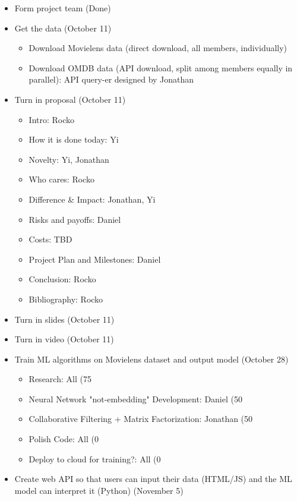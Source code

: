 \documentclass[sigchi, 12pt, nonacm=true, timestamp=true, screen=true]{acmart}
\begin{document}
\begin{itemize}
  \item Form project team (Done)
  \item Get the data (October 11)
    \begin{itemize}
      \item Download Movielens data (direct download, all members, individually) 
      \item Download OMDB data (API download, split among members equally in parallel): API query-er designed by Jonathan
    \end{itemize}
  \item Turn in proposal (October 11)
    \begin{itemize}
      \item Intro: Rocko
      \item How it is done today: Yi
      \item Novelty: Yi, Jonathan
      \item Who cares: Rocko
      \item Difference & Impact: Jonathan, Yi
      \item Risks and payoffs: Daniel
      \item Costs: TBD
      \item Project Plan and Milestones: Daniel
      \item Conclusion: Rocko
      \item Bibliography: Rocko
    \end{itemize}
  \item Turn in slides (October 11)
  \item Turn in video (October 11)
  \item Train ML algorithms on Movielens dataset and output model (October 28)
    \begin{itemize}
      \item Research: All (75%
      \item Neural Network "not-embedding" Development: Daniel (50%
      \item Collaborative Filtering + Matrix Factorization: Jonathan (50%
      \item Polish Code: All (0%
      \item Deploy to cloud for training?: All (0%
    \end{itemize}
  \item Create web API so that users can input their data (HTML/JS) and the ML model can interpret it (Python) (November 5)

\end{itemize}
\end{document}
